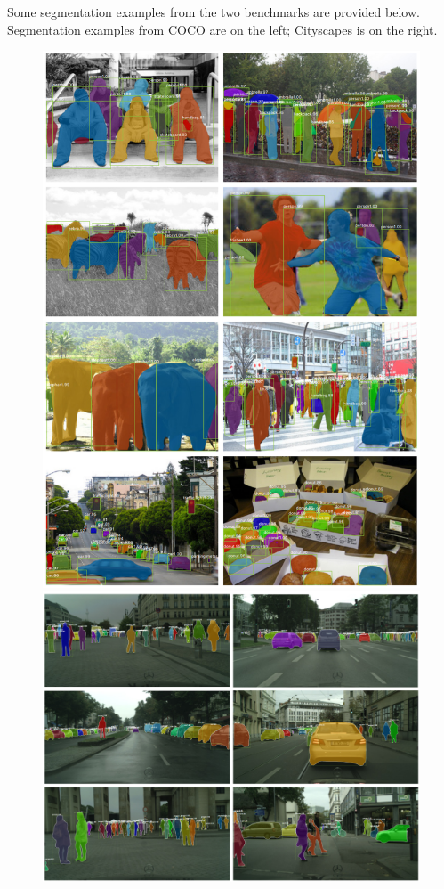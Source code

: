 Some segmentation examples from the two benchmarks are provided below. Segmentation examples from COCO are on the left; Cityscapes is on the right.


\begin{figure}[htbp]
	\centering
	\begin{minipage}{0.35\textwidth}
		\centering
		\includegraphics[width=1\textwidth]{images/cocoexamples.PNG} %
	\end{minipage}\hfill
	\begin{minipage}{0.65\textwidth}
		\centering
		\includegraphics[width=1\textwidth]{images/cityscapes.PNG} %

\end{minipage}
\end{figure}
